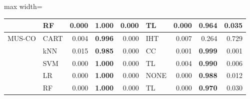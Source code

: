 \begin{table}[!htbp]
\begin{adjustbox}{max width=\linewidth}
\begin{tabular}{llrrrlrrr}
 & RF & 0.000 & \textbf{1.000} & 0.000 & TL & 0.000 & \textbf{0.964} & 0.035 \\
\midrule
MUS-CO & CART & 0.004 & \textbf{0.996} & 0.000 & IHT & 0.007 & 0.264 & 0.729 \\
 & kNN & 0.015 & \textbf{0.985} & 0.000 & CC & 0.001 & \textbf{0.999} & 0.001 \\
 & SVM & 0.000 & \textbf{1.000} & 0.000 & TL & 0.004 & \textbf{0.990} & 0.006 \\
 & LR & 0.000 & \textbf{1.000} & 0.000 & NONE & 0.000 & \textbf{0.988} & 0.012 \\
 & RF & 0.000 & \textbf{1.000} & 0.000 & TL & 0.000 & \textbf{0.970} & 0.030 \\
\bottomrule
\end{tabular}
\end{adjustbox}
\end{table}
